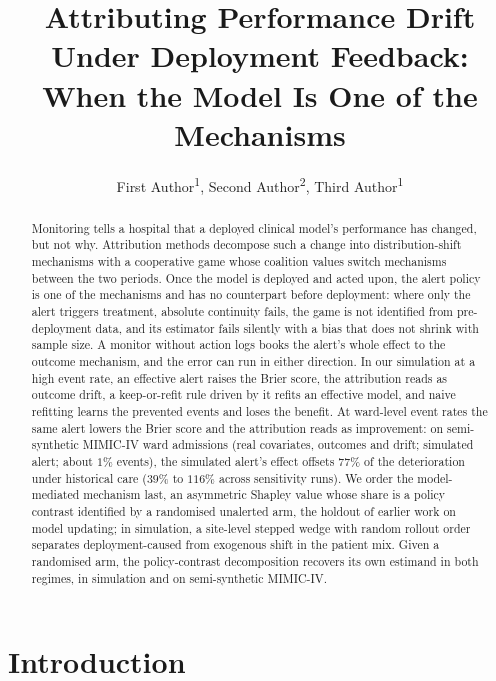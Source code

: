\documentclass[letterpaper]{article} %
\title{Attributing Performance Drift Under Deployment Feedback: When the Model Is One of the Mechanisms}
\author{
    First Author\textsuperscript{\rm 1},
    Second Author\textsuperscript{\rm 2},
    Third Author\textsuperscript{\rm 1}
}
\begin{document}
\maketitle

\begin{abstract}
Monitoring tells a hospital that a deployed clinical model's performance has
changed, but not why. Attribution methods decompose such a change into
distribution-shift mechanisms with a cooperative game whose coalition values
switch mechanisms between the two periods. Once the model is deployed and
acted upon, the alert policy is one of the mechanisms and has no counterpart
before deployment: where only the alert triggers treatment, absolute
continuity fails, the game is not identified from pre-deployment data, and
its estimator fails silently with a bias that does not shrink with sample
size. A monitor without action logs books the alert's whole effect to the
outcome mechanism, and the error can run in either direction. In our
simulation at a high event rate, an effective alert raises the Brier score,
the attribution reads as outcome drift, a keep-or-refit rule driven by it
refits an effective model, and naive refitting learns the prevented events
and loses the benefit. At ward-level event rates the same alert lowers the
Brier score and the attribution reads as improvement: on semi-synthetic
MIMIC-IV ward admissions (real covariates, outcomes and drift; simulated
alert; about $1\%$ events), the simulated
alert's effect offsets $77\%$ of the deterioration under historical care
($39\%$ to $116\%$ across sensitivity runs). We order
the model-mediated mechanism last, an asymmetric Shapley value whose share is
a policy contrast identified by a randomised unalerted arm, the holdout of
earlier work on model updating; in simulation, a site-level stepped wedge with
random rollout order separates deployment-caused from exogenous shift in the
patient mix. Given a randomised arm, the policy-contrast decomposition
recovers its own estimand in both regimes, in simulation and on
semi-synthetic MIMIC-IV.
\end{abstract}

\section{Introduction}
\label{sec:intro}
\end{document}

